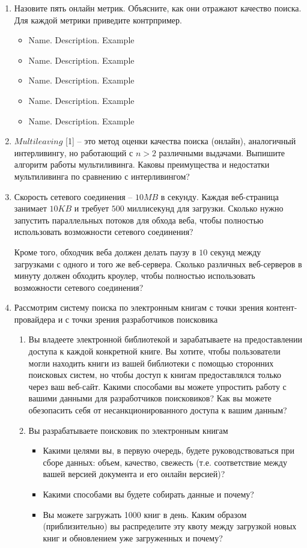 \begin{enumerate}
	\item Назовите пять онлайн метрик. Объясните, как они отражают качество поиска. Для 
	каждой метрики приведите контрпример.
	\begin{itemize}
		\item Name. Description. Example
		\item Name. Description. Example
		\item Name. Description. Example
		\item Name. Description. Example
		\item Name. Description. Example
	\end{itemize}
	
	\item $Multileaving$ [1] – это метод оценки качества поиска (онлайн), аналогичный 
	интерливингу, но работающий с $n > 2$ различными выдачами. Выпишите алгоритм работы 
	мультиливинга. Каковы преимущества и недостатки мультиливинга по сравнению с 
	интерливингом?
	
	\item Скорость сетевого соединения – $10MB$ в секунду. Каждая веб-страница занимает 
	$10KB$ и требует $500$ миллисекунд для загрузки. Сколько нужно запустить параллельных 
	потоков для обхода веба, чтобы полностью использовать возможности сетевого соединения?

	Кроме того, обходчик веба должен делать паузу в $10$ секунд между загрузками с одного и 
	того же веб-сервера. Сколько различных веб-серверов в минуту должен обходить кроулер, 
	чтобы полностью использовать возможности сетевого соединения?

	\item Рассмотрим систему поиска по электронным книгам с точки зрения контент-провайдера и 
	с точки зрения разработчиков поисковика
	
	\begin{enumerate}
		\item Вы владеете электронной библиотекой и зарабатываете на предоставлении доступа к 
		каждой конкретной книге. Вы хотите, чтобы пользователи могли находить книги из вашей 
		библиотеки с помощью сторонних поисковых систем, но чтобы доступ к книгам 
		предоставлялся только через ваш веб-сайт. Какими способами вы можете упростить работу 
		с вашими данными для разработчиков поисковиков? Как вы можете обезопасить себя от 
		несанкционированного доступа к вашим данным?
		\item Вы разрабатываете поисковик по электронным книгам
		\begin{itemize}
			\item Какими целями вы, в первую очередь, будете руководствоваться при сборе 
			данных: объем, качество, свежесть (т.е. соответствие между вашей версией 
			документа и его онлайн версией)?
			\item Какими способами вы будете собирать данные и почему?
			\item Вы можете загружать 1000 книг в день. Каким образом (приблизительно) вы 
			распределите эту квоту между загрузкой новых книг и обновлением уже загруженных и 
			почему?
		\end{itemize}
	\end{enumerate}
	

\end{enumerate}
